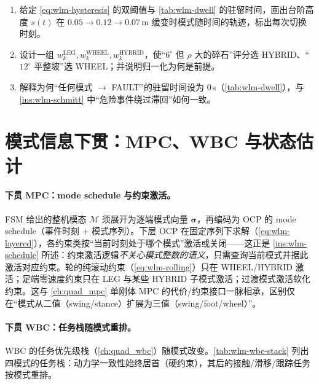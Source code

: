 \begin{practice}
\begin{enumerate}
  \item 给定 \cref{eq:wlm-hysteresis} 的双阈值与 \cref{tab:wlm-dwell} 的驻留时间，画出台阶高度 $s(t)$ 在 $0.05\to0.12\to0.07\,$m 缓变时模式随时间的轨迹，标出每次切换时刻。
  \item 设计一组 $w_k^{\mathrm{LEG}},w_k^{\mathrm{WHEEL}},w_k^{\mathrm{HYBRID}}$，使“$6^\circ$ 但 $\rho$ 大的碎石”评分选 HYBRID、“$12^\circ$ 平整坡”选 WHEEL；并说明归一化为何是前提。
  \item 解释为何“任何模式 $\to$ FAULT”的驻留时间设为 $0\,$s（\cref{tab:wlm-dwell}），与 \cref{ins:wlm-schmitt} 中“危险事件绕过滞回”如何一致。
\end{enumerate}
\end{practice}

\section{模式信息下贯：MPC、WBC 与状态估计}
\label{sec:wlm-downstream}

\paragraph{下贯 MPC：mode schedule 与约束激活。}
FSM 给出的整机模态 $\mathcal M$ 须展开为逐端模式向量 $\boldsymbol\sigma$，再编码为 OCP 的 mode schedule（事件时刻 + 模式序列）。下层 OCP 在固定序列下求解（\cref{eq:wlm-layered}），各约束类按“当前时刻处于哪个模式”激活或关闭——这正是 \cref{ins:wlm-schedule} 所述：约束激活逻辑\emph{不关心模式整数的语义}，只需查询当前模式并据此激活对应约束。轮的纯滚动约束（\cref{eq:wlm-rolling}）只在 WHEEL/HYBRID 激活；足端零速度约束只在 LEG 与某些 HYBRID 子模式激活；过渡模式激活软化约束。这与 \cref{ch:quad_mpc} 单刚体 MPC 的代价/约束接口一脉相承，区别仅在“模式从二值（swing/stance）扩展为三值（swing/foot/wheel）”。

\paragraph{下贯 WBC：任务栈随模式重排。}
WBC 的任务优先级栈（\cref{ch:quad_wbc}）随模式改变。\cref{tab:wlm-wbc-stack} 列出四模式的任务栈：动力学一致性始终居首（硬约束），其后的接触/滑移/跟踪任务按模式重排。


